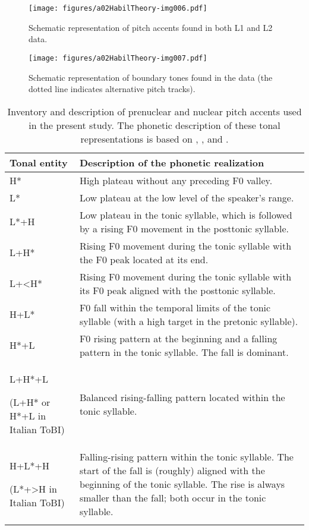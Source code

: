 \begin{figure}
\texttt{[image: figures/a02HabilTheory-img006.pdf]}
\caption{Schematic representation of pitch accents found in both L1 and L2 data.}
\label{fig:2.5}
\end{figure}

\begin{figure}
\texttt{[image: figures/a02HabilTheory-img007.pdf]}
\caption{Schematic representation of boundary tones found in the data (the dotted line indicates alternative pitch tracks).}
\label{fig:2.6}
\end{figure}

\begin{table}
\begin{tabularx}{\textwidth}{p{3cm}Q}
\lsptoprule
Tonal entity & Description of the phonetic realization\\\midrule
H* & High plateau without any preceding F0 valley.\\
\tablevspace
L* & Low plateau at the low level of the speaker’s range.\\
\tablevspace
L*+H & Low plateau in the tonic syllable, which is followed by a rising F0 movement in the posttonic syllable.\\
\tablevspace
L+H* & Rising F0 movement during the tonic syllable with the F0 peak located at its end.\\
\tablevspace
L+<H* & Rising F0 movement during the tonic syllable with its F0 peak aligned with the posttonic syllable.\\
\tablevspace
H+L* & F0 fall within the temporal limits of the tonic syllable (with a high target in the pretonic syllable).\\
\tablevspace
H*+L & F0 rising pattern at the beginning and a falling pattern in the tonic syllable. The fall is dominant. \\
\tablevspace
L+H*+L

(L+H* or H*+L in Italian ToBI) & Balanced rising-falling pattern located within the tonic syllable.\\
\tablevspace
H+L*+H

(L*+>H in Italian ToBI) & Falling-rising pattern within the tonic syllable. The start of the fall is (roughly) aligned with the beginning of the tonic syllable. The rise is always smaller than the fall; both occur in the tonic syllable.\\
\lspbottomrule
\end{tabularx}
\caption{Inventory and description of prenuclear and nuclear pitch accents used in the present study. The phonetic description of these tonal representations is based on \citet{AguilarEtAl2009}, \citet{Estebas-VilaplanaPrieto2008}, \citet{GabrielEtAl2010} and  \citet{GiliFivelaEtAl2015}.\label{tab:2.4a}}
\end{table}


